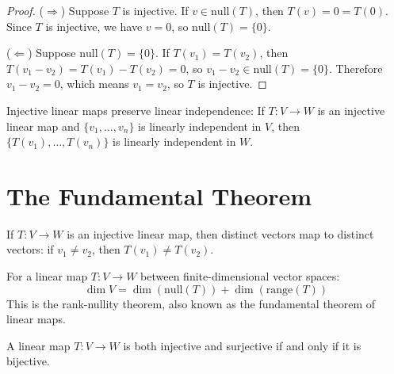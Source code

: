 \begin{proof}
($\Rightarrow$) Suppose $T$ is injective. If $v \in \text{null}(T)$, then $T(v) = 0 = T(0)$. Since $T$ is injective, we have $v = 0$, so $\text{null}(T) = \{0\}$.

($\Leftarrow$) Suppose $\text{null}(T) = \{0\}$. If $T(v_1) = T(v_2)$, then $T(v_1 - v_2) = T(v_1) - T(v_2) = 0$, so $v_1 - v_2 \in \text{null}(T) = \{0\}$. Therefore $v_1 - v_2 = 0$, which means $v_1 = v_2$, so $T$ is injective.
\end{proof}

\begin{theorem}
\label{injective-independence}
Injective linear maps preserve linear independence: If $T : V \to W$ is an injective linear map and $\{v_1, \ldots, v_n\}$ is linearly independent in $V$, then $\{T(v_1), \ldots, T(v_n)\}$ is linearly independent in $W$.
\end{theorem}

\section{The Fundamental Theorem}

\begin{theorem}
\label{fundamental-theorem-insight}
If $T : V \to W$ is an injective linear map, then distinct vectors map to distinct vectors: if $v_1 \neq v_2$, then $T(v_1) \neq T(v_2)$.
\end{theorem}

\begin{theorem}
\label{fundamental-theorem-educational}
For a linear map $T : V \to W$ between finite-dimensional vector spaces:
$$\dim V = \dim(\text{null}(T)) + \dim(\text{range}(T))$$
This is the rank-nullity theorem, also known as the fundamental theorem of linear maps.
\end{theorem}

\begin{theorem}
\label{fundamental-principle}
A linear map $T : V \to W$ is both injective and surjective if and only if it is bijective.
\end{theorem}

